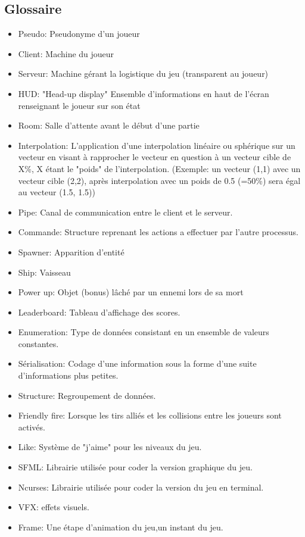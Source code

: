 \documentclass[french]{article}
\begin{document}
\subsection {Glossaire}
\begin{itemize}
    \item Pseudo: Pseudonyme d'un joueur
    \item Client: Machine du joueur
    \item Serveur: Machine gérant la logistique du jeu (transparent au joueur) 
    \item HUD: "Head-up display" Ensemble d'informations en haut de l'écran renseignant le joueur sur son état  
    \item Room: Salle d'attente avant le début d'une partie
    \item Interpolation: %
    L'application d'une interpolation linéaire ou sphérique sur un vecteur en visant à rapprocher le vecteur en question à un vecteur cible de X\%, X étant le "poids" de l'interpolation. (Exemple: un vecteur (1,1) avec un vecteur cible (2,2), après interpolation avec un poids de 0.5 (=50\%) sera égal au vecteur (1.5, 1.5))
    \item Pipe: Canal de communication entre le client et le serveur.
    \item Commande: Structure reprenant les actions a effectuer par l'autre processus.
    \item Spawner: Apparition d'entité 
    \item Ship: Vaisseau
    \item Power up: Objet (bonus) lâché par un ennemi lors de sa mort
    \item Leaderboard: Tableau d'affichage des scores.
    \item Enumeration: Type de données consistant en un ensemble de valeurs constantes.
    \item Sérialisation: Codage d'une information sous la forme d'une suite d'informations plus petites.
    \item Structure: Regroupement de données.
    \item Friendly fire: Lorsque les tirs alliés et les collisions entre les joueurs sont activés.
    \item Like: Système de "j'aime" pour les niveaux du jeu. 
    \item SFML: Librairie utilisée pour coder la version graphique du jeu.
    \item Ncurses: Librairie utilisée pour coder la version du jeu en terminal.
    \item VFX: effets visuels.
    \item Frame: Une étape d'animation du jeu,un instant du jeu.\newline\newline
    
    
\end{itemize}
\end{document}
